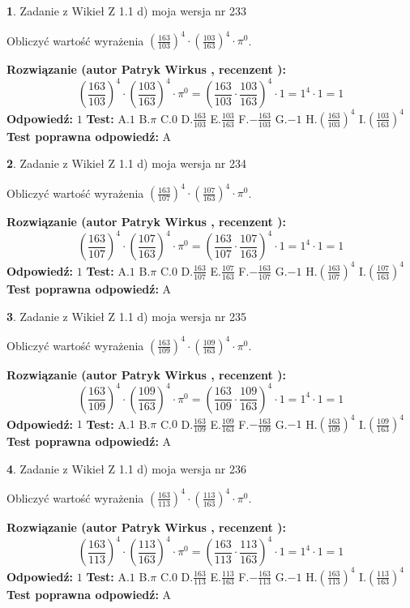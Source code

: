 \documentclass[12pt, a4paper]{article}
\theoremstyle{definition} %
\newtheorem{zad}{}
\newcommand{\zadStart}[1]{\begin{zad}#1\newline}
\newcommand{\zadStop}{\end{zad}}
\newcommand{\rozwStart}[2]{\noindent \textbf{Rozwiązanie (autor #1 , recenzent #2): }\newline}
\newcommand{\rozwStop}{\newline}
\newcommand{\odpStart}{\noindent \textbf{Odpowiedź:}\newline}
\newcommand{\odpStop}{\newline}
\newcommand{\testStart}{\noindent \textbf{Test:}\newline}
\newcommand{\testStop}{\newline}
\newcommand{\kluczStart}{\noindent \textbf{Test poprawna odpowiedź:}\newline}
\newcommand{\kluczStop}{\newline}
\begin{document}
\zadStart{Zadanie z Wikieł Z 1.1 d) moja wersja nr 233}

Obliczyć wartość wyrażenia $(\frac{163}{103})^{4} \cdot (\frac{103}{163})^{4} \cdot \pi^{0}$.
\zadStop
\rozwStart{Patryk Wirkus}{}
$$(\frac{163}{103})^{4} \cdot (\frac{103}{163})^{4} \cdot \pi^{0} = (\frac{163}{103} \cdot \frac{103}{163})^{4} \cdot 1 = 1^{4} \cdot 1 = 1$$
\rozwStop
\odpStart
$1$
\odpStop
\testStart
A.$1$ B.$\pi$ C.$0$ D.$\frac{163}{103}$ E.$\frac{103}{163}$
F.$-\frac{163}{103}$ G.$-1$
H.$(\frac{163}{103})^{4}$
I.$(\frac{103}{163})^{4}$
\testStop
\kluczStart
A
\kluczStop



\zadStart{Zadanie z Wikieł Z 1.1 d) moja wersja nr 234}

Obliczyć wartość wyrażenia $(\frac{163}{107})^{4} \cdot (\frac{107}{163})^{4} \cdot \pi^{0}$.
\zadStop
\rozwStart{Patryk Wirkus}{}
$$(\frac{163}{107})^{4} \cdot (\frac{107}{163})^{4} \cdot \pi^{0} = (\frac{163}{107} \cdot \frac{107}{163})^{4} \cdot 1 = 1^{4} \cdot 1 = 1$$
\rozwStop
\odpStart
$1$
\odpStop
\testStart
A.$1$ B.$\pi$ C.$0$ D.$\frac{163}{107}$ E.$\frac{107}{163}$
F.$-\frac{163}{107}$ G.$-1$
H.$(\frac{163}{107})^{4}$
I.$(\frac{107}{163})^{4}$
\testStop
\kluczStart
A
\kluczStop



\zadStart{Zadanie z Wikieł Z 1.1 d) moja wersja nr 235}

Obliczyć wartość wyrażenia $(\frac{163}{109})^{4} \cdot (\frac{109}{163})^{4} \cdot \pi^{0}$.
\zadStop
\rozwStart{Patryk Wirkus}{}
$$(\frac{163}{109})^{4} \cdot (\frac{109}{163})^{4} \cdot \pi^{0} = (\frac{163}{109} \cdot \frac{109}{163})^{4} \cdot 1 = 1^{4} \cdot 1 = 1$$
\rozwStop
\odpStart
$1$
\odpStop
\testStart
A.$1$ B.$\pi$ C.$0$ D.$\frac{163}{109}$ E.$\frac{109}{163}$
F.$-\frac{163}{109}$ G.$-1$
H.$(\frac{163}{109})^{4}$
I.$(\frac{109}{163})^{4}$
\testStop
\kluczStart
A
\kluczStop



\zadStart{Zadanie z Wikieł Z 1.1 d) moja wersja nr 236}

Obliczyć wartość wyrażenia $(\frac{163}{113})^{4} \cdot (\frac{113}{163})^{4} \cdot \pi^{0}$.
\zadStop
\rozwStart{Patryk Wirkus}{}
$$(\frac{163}{113})^{4} \cdot (\frac{113}{163})^{4} \cdot \pi^{0} = (\frac{163}{113} \cdot \frac{113}{163})^{4} \cdot 1 = 1^{4} \cdot 1 = 1$$
\rozwStop
\odpStart
$1$
\odpStop
\testStart
A.$1$ B.$\pi$ C.$0$ D.$\frac{163}{113}$ E.$\frac{113}{163}$
F.$-\frac{163}{113}$ G.$-1$
H.$(\frac{163}{113})^{4}$
I.$(\frac{113}{163})^{4}$
\testStop
\kluczStart
A
\kluczStop
\end{document}
